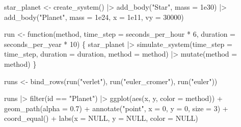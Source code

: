 \documentclass[
  10.5pt,
  letterpaper,
]{scrbook}
\newenvironment{Shaded}{\begin{snugshade}}{\end{snugshade}}
\newcommand{\AttributeTok}[1]{\textcolor[rgb]{0.00,0.00,0.00}{#1}}
\newcommand{\ConstantTok}[1]{\textcolor[rgb]{0.00,0.00,0.00}{#1}}
\newcommand{\ControlFlowTok}[1]{\textcolor[rgb]{0.00,0.00,0.00}{#1}}
\newcommand{\DecValTok}[1]{\textcolor[rgb]{0.00,0.00,0.00}{#1}}
\newcommand{\FloatTok}[1]{\textcolor[rgb]{0.00,0.00,0.00}{#1}}
\newcommand{\FunctionTok}[1]{\textcolor[rgb]{0.00,0.00,0.00}{#1}}
\newcommand{\NormalTok}[1]{\textcolor[rgb]{0.00,0.00,0.00}{#1}}
\newcommand{\OtherTok}[1]{\textcolor[rgb]{0.00,0.00,0.00}{#1}}
\newcommand{\SpecialCharTok}[1]{\textcolor[rgb]{0.00,0.00,0.00}{#1}}
\newcommand{\StringTok}[1]{\textcolor[rgb]{0.00,0.00,0.00}{#1}}
\theoremstyle{definition}
\theoremstyle{plain}
\theoremstyle{remark}
\begin{document}
\begin{Shaded}
\begin{Highlighting}[]
\NormalTok{star\_planet }\OtherTok{\textless{}{-}} \FunctionTok{create\_system}\NormalTok{() }\SpecialCharTok{|\textgreater{}}
  \FunctionTok{add\_body}\NormalTok{(}\StringTok{"Star"}\NormalTok{,   }\AttributeTok{mass =} \FloatTok{1e30}\NormalTok{) }\SpecialCharTok{|\textgreater{}}
  \FunctionTok{add\_body}\NormalTok{(}\StringTok{"Planet"}\NormalTok{, }\AttributeTok{mass =} \FloatTok{1e24}\NormalTok{, }\AttributeTok{x =} \FloatTok{1e11}\NormalTok{, }\AttributeTok{vy =} \DecValTok{30000}\NormalTok{)}

\NormalTok{run }\OtherTok{\textless{}{-}} \ControlFlowTok{function}\NormalTok{(method, }\AttributeTok{time\_step =}\NormalTok{ seconds\_per\_hour }\SpecialCharTok{*} \DecValTok{6}\NormalTok{,}
                \AttributeTok{duration =}\NormalTok{ seconds\_per\_year }\SpecialCharTok{*} \DecValTok{10}\NormalTok{) \{}
\NormalTok{  star\_planet }\SpecialCharTok{|\textgreater{}}
    \FunctionTok{simulate\_system}\NormalTok{(}\AttributeTok{time\_step =}\NormalTok{ time\_step, }\AttributeTok{duration =}\NormalTok{ duration,}
                    \AttributeTok{method =}\NormalTok{ method) }\SpecialCharTok{|\textgreater{}}
    \FunctionTok{mutate}\NormalTok{(}\AttributeTok{method =}\NormalTok{ method)}
\NormalTok{\}}

\NormalTok{runs }\OtherTok{\textless{}{-}} \FunctionTok{bind\_rows}\NormalTok{(}\FunctionTok{run}\NormalTok{(}\StringTok{"verlet"}\NormalTok{), }\FunctionTok{run}\NormalTok{(}\StringTok{"euler\_cromer"}\NormalTok{), }\FunctionTok{run}\NormalTok{(}\StringTok{"euler"}\NormalTok{))}
\end{Highlighting}
\end{Shaded}

\begin{Shaded}
\begin{Highlighting}[]
\NormalTok{runs }\SpecialCharTok{|\textgreater{}}
  \FunctionTok{filter}\NormalTok{(id }\SpecialCharTok{==} \StringTok{"Planet"}\NormalTok{) }\SpecialCharTok{|\textgreater{}}
  \FunctionTok{ggplot}\NormalTok{(}\FunctionTok{aes}\NormalTok{(x, y, }\AttributeTok{color =}\NormalTok{ method)) }\SpecialCharTok{+}
  \FunctionTok{geom\_path}\NormalTok{(}\AttributeTok{alpha =} \FloatTok{0.7}\NormalTok{) }\SpecialCharTok{+}
  \FunctionTok{annotate}\NormalTok{(}\StringTok{"point"}\NormalTok{, }\AttributeTok{x =} \DecValTok{0}\NormalTok{, }\AttributeTok{y =} \DecValTok{0}\NormalTok{, }\AttributeTok{size =} \DecValTok{3}\NormalTok{) }\SpecialCharTok{+}
  \FunctionTok{coord\_equal}\NormalTok{() }\SpecialCharTok{+}
  \FunctionTok{labs}\NormalTok{(}\AttributeTok{x =} \ConstantTok{NULL}\NormalTok{, }\AttributeTok{y =} \ConstantTok{NULL}\NormalTok{, }\AttributeTok{color =} \ConstantTok{NULL}\NormalTok{)}
\end{Highlighting}
\end{Shaded}
\end{document}
